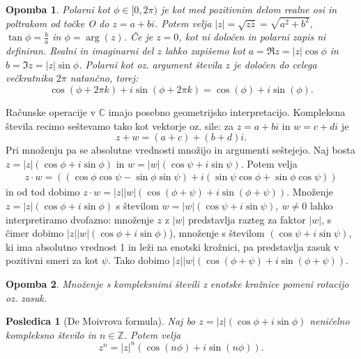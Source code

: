 \documentclass[10pt, a4paper]{article}
\newtheorem{posledica}[izr]{Posledica}
\newtheorem*{opomba}{Opomba}
\newcommand{\Z}{\mathbb {Z}}
\newcommand{\C}{\mathbb {C}}
\begin{document}
\begin{opomba}
    Polarni kot $\phi \in [0, 2\pi)$ je kot med pozitivnim delom realne osi in poltrakom od točke O do $z = a + bi$.
    Potem velja $|z| = \sqrt{z \overline{z}} = \sqrt{a^2 + b^2}$, $\tan \phi = \frac{b}{a}$ in $\phi = \arg (z)$.
    Če je $z = 0$, kot ni določen in polarni zapis ni definiran. Realni in imaginarni del $z$ lahko zapišemo kot $a = \Re z = |z| \cos \phi$ in $b = \Im z = |z| \sin \phi$. 
    Polarni kot oz. argument števila $z$ je določen do celega večkratnika $2\pi$ natančno, torej: $$\cos(\phi + 2\pi k) + i\sin(\phi + 2 \pi k) = \cos(\phi) + i\sin(\phi).$$
\end{opomba}

Računske operacije v $\C$ imajo posebno geometrijsko interpretacijo. Kompleksna števila recimo seštevamo tako kot vektorje oz. sile:
za $z = a+bi$ in $w = c + di$ je $$z+w = (a+c) + (b+d)i.$$ Pri množenju pa se absolutne vrednosti množijo in argumenti seštejejo. Naj bosta $z = |z|(\cos \phi + i \sin \phi)$ in $w = |w|(\cos \psi + i \sin \psi)$. Potem velja
    \begin{align*}
        z \cdot w =  \left((\cos\phi \cos \psi - \sin\phi \sin \psi) + i(\sin \psi \cos \phi + \sin \phi \cos\psi)\right)
    \end{align*}
    in od tod dobimo $z \cdot w = |z||w| \left( \cos (\phi + \psi) + i \sin (\phi + \psi) \right)$.
    Množenje $z = |z|(\cos \phi + i \sin \phi)$ s številom $w = |w| (\cos \psi + i \sin \psi),\ w \neq 0$ lahko interpretiramo dvofazno: 
    množenje $z$ z $|w|$ predstavlja razteg za faktor $|w|$, s čimer dobimo $|z||w|(\cos \phi + i \sin \phi)$), množenje s številom $(\cos \psi + i \sin \psi)$, ki ima absolutno vrednost 1 in leži na enotski krožnici, pa predstavlja zasuk v pozitivni smeri za kot $\psi$. 
    Tako dobimo $|z||w| (\cos(\phi + \psi) + i \sin(\phi + \psi))$.

\begin{opomba}
    Množenje s kompleksnimi števili z enotske krožnice pomeni rotacijo oz. zasuk.
\end{opomba}

\begin{posledica}[De Moivrova formula]
    Naj bo $z = |z|(\cos \phi + i \sin \phi)$ neničelno kompleksno število in $n \in \Z$. Potem velja
    $$z^n = |z|^n (\cos (n\phi) + i \sin(n\phi)).$$
\end{posledica}
\end{document}
